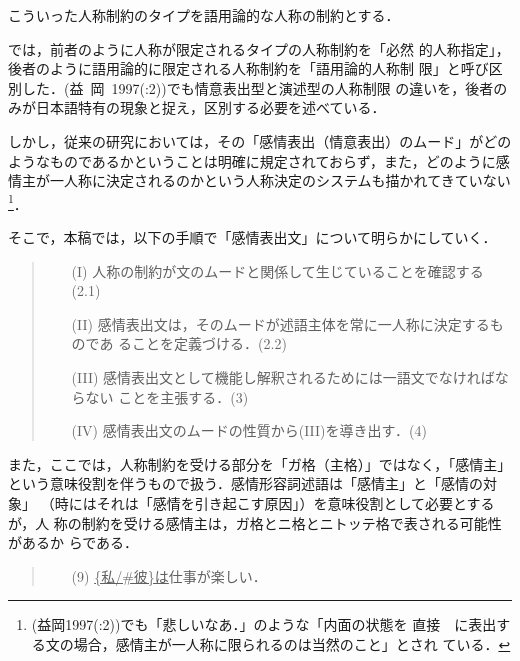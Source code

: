 こういった人称制約のタイプを語用論的な人称の制約とする．

\cite{東1997}では，前者のように人称が限定されるタイプの人称制約を「必然
的人称指定」，後者のように語用論的に限定される人称制約を「語用論的人称制
限」と呼び区別した．(益~岡~1997(:2))でも情意表出型と演述型の人称制限
の違いを，後者のみが日本語特有の現象と捉え，区別する必要を述べている．

しかし，従来の研究においては，その「感情表出（情意表出）のムード」がどの
ようなものであるかということは明確に規定されておらず，また，どのように感
情主が一人称に決定されるのかという人称決定のシステムも描かれてきていない
\footnote{(益岡1997(:2))でも「悲しいなあ．」のような「内面の状態を
直接　に表出する文の場合，感情主が一人称に限られるのは当然のこと」とされ
ている．}．

そこで，本稿では，以下の手順で「感情表出文」について明らかにしていく．

\vspace{0.3cm}
\begin{quote}
\begin{itemize}
 \item[(I)] 人称の制約が文のムードと関係して生じていることを確認する(2.1)
 \item[(II)] 感情表出文は，そのムードが述語主体を常に一人称に決定するものであ
       ることを定義づける．(2.2)
 \item[(III)] 感情表出文として機能し解釈されるためには一語文でなければならない
       ことを主張する．(3)
 \item[(IV)] 感情表出文のムードの性質から(III)を導き出す．(4)
\end{itemize}
\end{quote}
\vspace{0.3cm}

また，ここでは，人称制約を受ける部分を「ガ格（主格）」ではなく，「感情主」
という意味役割を伴うもので扱う．感情形容詞述語は「感情主」と「感情の対象」
（時にはそれは「感情を引き起こす原因」）を意味役割として必要とするが，人
称の制約を受ける感情主は，ガ格とニ格とニトッテ格で表される可能性があるか
らである．

\vspace{0.3cm}
\begin{quote}
\begin{itemize}
 \item[(9)] \underline{\{私/\#彼\}は}仕事が楽しい．
\end{itemize}
\end{quote}
\vspace{0.3cm}

